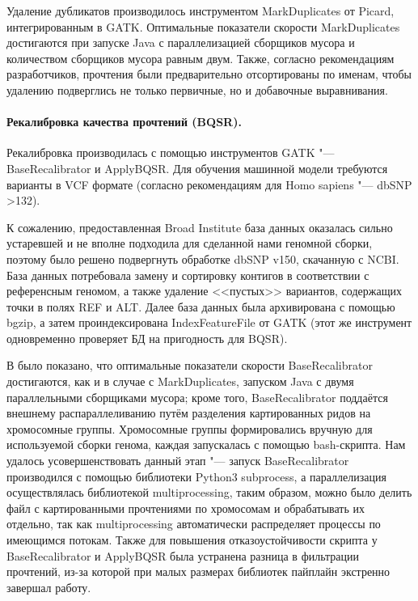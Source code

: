 \documentclass[a4paper,12pt]{article}
\begin{document}
Удаление дубликатов производилось инструментом MarkDuplicates от Picard\cite{picard}, интегрированным в GATK.
Оптимальные показатели скорости MarkDuplicates достигаются при запуске Java с параллелизацией сборщиков мусора и количеством сборщиков мусора равным двум\cite{heldenbrand}.
Также, согласно рекомендациям разработчиков, прочтения были предварительно отсортированы по именам, чтобы удалению подверглись не только первичные, но и добавочные выравнивания\cite{gatk}.

\paragraph{Рекалибровка качества прочтений (BQSR).}
Рекалибровка производилась с помощью инструментов GATK "--- BaseRecalibrator и ApplyBQSR.
Для обучения машинной модели требуются варианты в VCF формате (согласно рекомендациям для Homo sapiens "--- dbSNP >132).

К сожалению, предоставленная Broad Institute база данных оказалась сильно устаревшей и не вполне подходила для сделанной нами геномной сборки, поэтому было решено подвергнуть обработке dbSNP v150, скачанную с NCBI\cite{dbsnp}.
База данных потребовала замену и сортировку контигов в соответствии с референсным геномом, а также удаление <<пустых>> вариантов, содержащих точки в полях REF и ALT.
Далее база данных была архивирована с помощью bgzip, а затем проиндексирована IndexFeatureFile от GATK (этот же инструмент одновременно проверяет БД на пригодность для BQSR).

В \cite{heldenbrand} было показано, что оптимальные показатели скорости BaseRecalibrator достигаются, как и в случае с MarkDuplicates, запуском Java с двумя параллельными сборщиками мусора;
кроме того, BaseRecalibrator поддаётся внешнему распараллеливанию путём разделения картированных ридов на хромосомные группы.
Хромосомные группы формировались вручную для используемой сборки генома, каждая запускалась с помощью bash-скрипта.
Нам удалось усовершенствовать данный этап "--- запуск BaseRecalibrator производился с помощью библиотеки Python3 subprocess, а параллелизация осуществлялась библиотекой multiprocessing, таким образом, можно было делить файл с картированными прочтениями по хромосомам и обрабатывать их отдельно, так как multiprocessing автоматически распределяет процессы по имеющимся потокам.
Также для повышения отказоустойчивости скрипта у BaseRecalibrator и ApplyBQSR была устранена разница в фильтрации прочтений, из-за которой при малых размерах библиотек пайплайн экстренно завершал работу.
\end{document}
